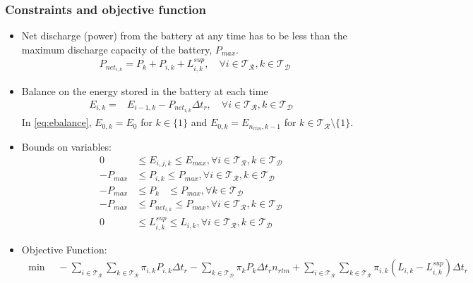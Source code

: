 \documentclass[11pt,twoside]{article}
\begin{document}
\subsubsection{Constraints and objective function}\label{subsec:const_obj}
\begin{itemize}
\item Net discharge (power) from the battery at any time has to be less than the maximum discharge capacity of the battery, $P_{max}$.
\begin{align}\label{eq:Pnet}
&P_{{net}_{i,k}} = P_{k} + P_{i,k} + L^{sup}_{i,k}, \quad \forall i \in \mathcal{T_R}, k \in \mathcal{T_D}
\end{align}
\item Balance on the energy stored in the battery at each time
\begin{align}\label{eq:ebalance}
E_{i,k} =& E_{i-1,k}- P_{{net}_{i,k}}\Delta t_r, \quad \forall i \in \mathcal{T_R}, k \in \mathcal{T_D}
\end{align}
In \ref{eq:ebalance}, $E_{0,k} = E_{0}$ for $k \in \lbrace1\rbrace$ and $E_{0,k} = E_{n_{rtm},k-1}$ for $k \in \mathcal{T_R}\setminus{\lbrace1\rbrace}$. 
\item Bounds on variables:
\begin{subequations}\label{eq:bounds}
\begin{align}
0 & \leq E_{i,j,k} \leq E_{max}, \forall i \in \mathcal{T_R}, k \in \mathcal{T_D}\\
-P_{max} & \leq P_{i,k} \leq P_{max}, \forall i \in \mathcal{T_R}, k \in \mathcal{T_D}\\
-P_{max} & \leq P_{k}\phantom{i,} \leq P_{max}, \forall k \in \mathcal{T_D}\\
-P_{max} & \leq P_{{net}_{i,k}} \leq P_{max}, \forall i \in \mathcal{T_R}, k \in \mathcal{T_D}\\
0 & \leq L^{sup}_{i,k} \leq L_{i,k}, \forall i \in \mathcal{T_R}, k \in \mathcal{T_D}
\end{align}
\end{subequations}
\item Objective Function:
\begin{align}\label{objective}
\min \quad -\sum\limits_{i \in \mathcal{T_R}}\sum\limits_{k \in \mathcal{T_R}} \pi_{i,k}P_{i,k}\Delta t_r - \sum\limits_{k \in \mathcal{T_D}}\pi_{k}P_{k}\Delta t_r n_{rtm} + \sum\limits_{i \in \mathcal{T_R}}\sum\limits_{k \in \mathcal{T_R}} \pi_{i,k}(L_{i,k}-L^{sup}_{i,k})\Delta t_r
\end{align}
\end{itemize}
\end{document}
